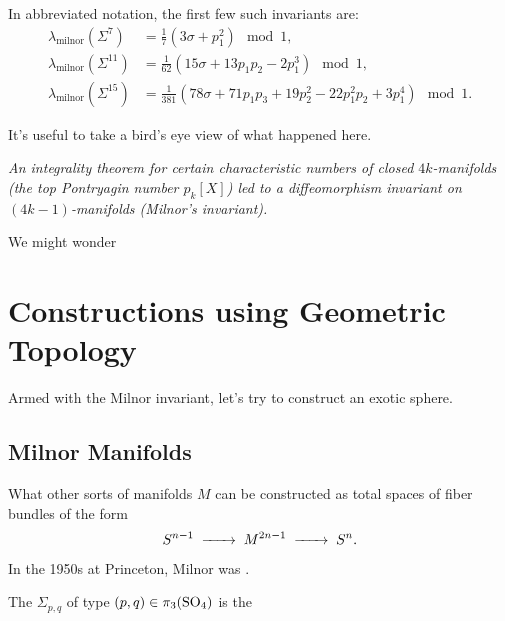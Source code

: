 \begin{example}
	In abbreviated notation, the first few such invariants are:
	\[
		\begin{aligned}
			\lambda_{\mathrm{milnor}}(\Sigma^7) &= \frac{1}{7}\left(3\sigma + p_1^2\right)\mod 1,\\
			\lambda_{\mathrm{milnor}}(\Sigma^{11}) &= \frac{1}{62}\left(15\sigma + 13p_1p_2 -2 p_1^3\right)\mod 1,\\
			\lambda_{\mathrm{milnor}}(\Sigma^{15}) &= \frac{1}{381}\left(78\sigma + 71p_1p_3 + 19p_2^2 - 22p_1^2p_2 + 3p_1^4\right)\mod 1.
		\end{aligned}
	\]
\end{example}

It's useful to take a bird's eye view of what happened here.
\begin{center}
\textsl{An integrality theorem for certain characteristic numbers of closed $4k$-manifolds (the top Pontryagin number $p_k[X]$) led to a diffeomorphism invariant on $(4k-1)$-manifolds (Milnor's invariant).}
\end{center}
We might wonder 


\section{Constructions using Geometric Topology}

Armed with the Milnor invariant, let's try to construct an exotic sphere.

\subsection*{Milnor Manifolds}

What other sorts of manifolds $M$ can be constructed as total spaces of fiber bundles of the form
\[
	S^{n-1} \lkxto M^{2n-1} \lkxto S^n.
\]

\begin{historicalremark*}
	In the 1950s at Princeton, Milnor was \cite{milnor2000exotic}. 
\end{historicalremark*}


\begin{definition}
	The  $\Sigma_{p,q}$ of type $(p,q)\in \pi_3({\operatorname{SO}}_4)$ is the
\end{definition}

